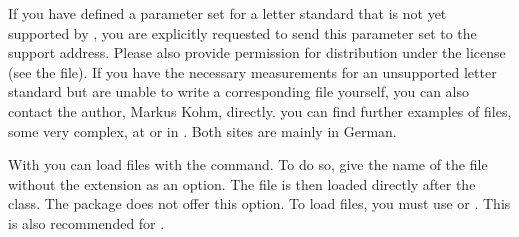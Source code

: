 If you have defined a parameter set for a letter standard that is not yet
supported by \KOMAScript{}, you are explicitly requested to send this
parameter set to the \KOMAScript{} support address. Please also provide
permission for distribution under the \KOMAScript{} license (see the
 file). If you have the necessary measurements for an
unsupported letter standard but are unable to write a corresponding 
file yourself, you can also contact the \KOMAScript{} author, Markus Kohm,
directly. you can find further examples of  files, some very
complex, at \cite{homepage} or in \cite{DANTE:TK0203:MJK}. Both sites are
mainly in German.


\begin{Declaration}
\end{Declaration}
With  you can load  files
with the  command. To do so, give the name of the
 file without the extension as an option. The
 file is then loaded directly after the class. The
 package does not offer this option.
To load  files, you must use  or
.
This is also recommended for .

